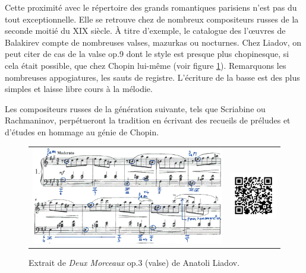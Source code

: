 Cette proximité avec le répertoire des grands romantiques parisiens n'est pas du tout exceptionnelle. Elle se retrouve chez de nombreux compositeurs russes de la seconde moitié du XIX\ieme{} siècle. À titre d'exemple, le catalogue des l'œuvres de Balakirev compte de nombreuses valses, mazurkas ou nocturnes. Chez Liadov, on peut citer de cas de la valse op.9  dont le style est presque plus chopinesque, si cela était possible, que chez Chopin lui-même (voir figure \ref{liadov}). Remarquons les nombreuses appogiatures, les sauts de registre. L'écriture de la basse est des plus simples et laisse libre cours à la mélodie.

Les compositeurs russes de la génération suivante, tels que Scriabine ou Rachmaninov, perpétueront la tradition en écrivant des recueils de préludes et d'études en hommage au génie de Chopin.\\

\vspace*{-0.25cm}

\begin{figure}[!ht]
  \begin{bigcenter}
    \begin{tabular}{lr}
      \includegraphics[width=12.5cm, keepaspectratio]{liadov.png}
      &
      \includegraphics[width=3cm, keepaspectratio]{liadov-qr.png}
    \end{tabular}
  \end{bigcenter}
  \caption{\label{liadov}Extrait de \emph{Deux Morceaux} op.3  (valse) de Anatoli Liadov.}
\end{figure}

